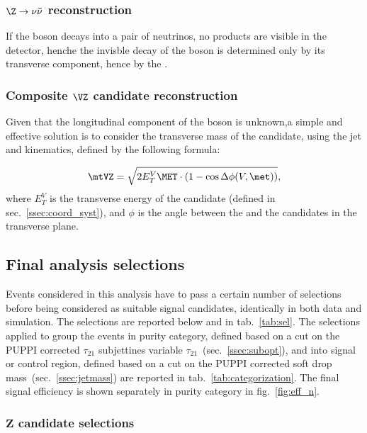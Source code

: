 \subsubsection{$\mathbf{\Z \rightarrow \nu \bar{\nu} }$ reconstruction}
\label{ssec:Zcand}

If the \Z boson decays into a pair of neutrinos, no products are visible in the detector, henche the invisble decay of the \Z boson is determined only by its transverse component, hence by the \MET.

\subsubsection{Composite $\mathbf{\VZ}$ candidate reconstruction}
\label{ssec:VZcand}

Given that the longitudinal component of the \Z boson is unknown,a simple and effective solution is to consider the transverse mass of the \VZ candidate, using the jet and \met kinematics, defined by the following formula:

\begin{equation}
\mtVZ = \sqrt{ 2 E_T^V \MET \cdot (1 - \cos \Delta \phi(V,\met)) },
\end{equation}
where $E_T^{V}$ is the transverse energy of the \V candidate (defined in sec.~\ref{ssec:coord_syst}), and $\phi$ is the angle between the \V and the \Z candidates in the transverse plane.

\subsection{Final analysis selections}
\label{sec:selections}

Events considered in this analysis have to pass a certain number of selections before being considered as suitable signal candidates, identically in both data and simulation. The selections are reported below and in tab.~\ref{tab:sel}. The selections applied to group the events in purity category, defined based on a cut on the PUPPI corrected $\tau_{21}$ subjettines variable $\tau_{21}$~(sec.~\ref{ssec:subopt}), and into signal or control region, defined based on a cut on the PUPPI corrected soft drop mass~(sec.~\ref{ssec:jetmass}) are reported in tab.~\ref{tab:categorization}. The final signal efficiency is shown separately in purity category in fig.~\ref{fig:eff_n}.

\subsubsection{$\mathbf{Z}$ candidate selections}

